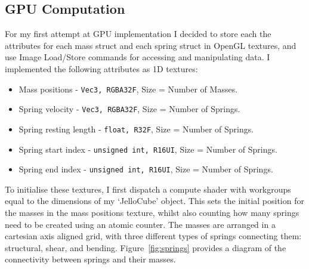 \documentclass[]{acmsiggraph}
\begin{document}
\subsection{GPU Computation}

For my first attempt at GPU implementation I decided to store each the attributes for each mass struct and each spring struct in OpenGL textures, and use Image Load/Store commands for accessing and manipulating data. I implemented the following attributes as 1D textures:

\begin{itemize}
	\item Mass positions - \lstinline{Vec3, RGBA32F}, Size = Number of Masses.
	\item Spring velocity - \lstinline{Vec3, RGBA32F}, Size = Number of Springs.
	\item Spring resting length - \lstinline{float, R32F}, Size = Number of Springs.
	\item Spring start index - \lstinline{unsigned int, R16UI}, Size = Number of Springs.
	\item Spring end index - \lstinline{unsigned int, R16UI}, Size = Number of Springs.
\end{itemize}

To initialise these textures, I first dispatch a compute shader with workgroups equal to the dimensions of my ‘JelloCube’ object. This sets the initial position for the masses in the mass positions texture, whilst also counting how many springs need to be created using an atomic counter. The masses are arranged in a cartesian axis aligned grid, with three different types of springs connecting them: structural, shear, and bending. Figure~\ref{fig:springs} provides a diagram of the connectivity between springs and their masses.
\end{document}
